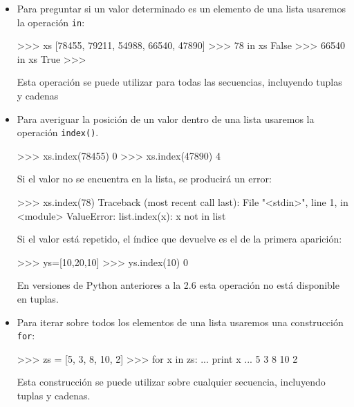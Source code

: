 \begin{itemize}
\item Para preguntar si un valor determinado es un elemento de una lista
usaremos la operación \lstinline+in+:

\begin{codigo-python-sn}
>>> xs
[78455, 79211, 54988, 66540, 47890]
>>> 78 in xs
False
>>> 66540 in xs
True
>>>
\end{codigo-python-sn}

\begin{observacion}
Esta operación se puede utilizar para todas las secuencias, incluyendo
tuplas y cadenas
\end{observacion}

\item Para averiguar la posición de un valor dentro de una lista usaremos
la operación \lstinline+index()+.

\begin{codigo-python-sn}
>>> xs.index(78455)
0
>>> xs.index(47890)
4
\end{codigo-python-sn}

\begin{atencion}
Si el valor no se encuentra en la lista, se producirá un error:

\begin{codigo-python-sn}
>>> xs.index(78)
Traceback (most recent call last):
  File "<stdin>", line 1, in <module>
ValueError: list.index(x): x not in list
\end{codigo-python-sn}
\end{atencion}

Si el valor está repetido, el índice que devuelve es el de la primera aparición:

\begin{codigo-python-sn}
>>> ys=[10,20,10]
>>> ys.index(10)
0
\end{codigo-python-sn}

\begin{observacion}
En versiones de Python anteriores a la 2.6 esta operación no está disponible
en tuplas.
\end{observacion}

\item Para iterar sobre todos los elementos de una lista usaremos una
construcción \lstinline+for+:

\begin{codigo-python-sn}
>>> zs = [5, 3, 8, 10, 2]
>>> for x in zs:
...     print x
...
5
3
8
10
2
\end{codigo-python-sn}

\begin{observacion}
Esta construcción se puede utilizar sobre cualquier secuencia, incluyendo
tuplas y cadenas.
\end{observacion}

\end{itemize}

